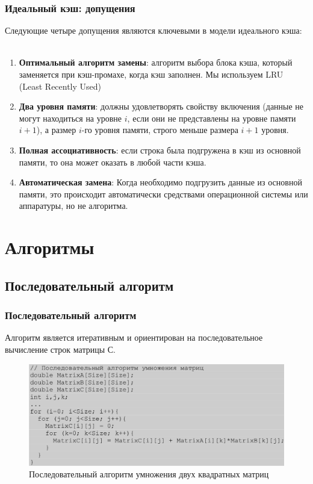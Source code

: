 \documentclass{beamer}
\begin{document}
\begin{frame}
\frametitle{Идеальный кэш: допущения}
Следующие четыре допущения являются ключевыми в модели идеального кэша:\\~\\

\begin{enumerate}
\item \textbf{Оптимальный алгоритм замены}: алгоритм выбора блока кэша, который заменяется при кэш-промахе, когда кэш заполнен. Мы используем LRU (Least Recently Used)
\item \textbf{Два уровня памяти}: должны удовлетворять свойству включения (данные не могут находиться на уровне $i$, если они не представлены на уровне памяти $i + 1$), а размер $i$-го уровня памяти, строго меньше размера $i + 1$ уровня.
\item \textbf{Полная ассоциативность}: если строка была подгружена в кэш из основной памяти, то она может оказать в любой части кэша.
\item \textbf{Автоматическая замена}: Когда необходимо подгрузить данные из основной памяти, это происходит автоматически средствами операционной системы или аппаратуры, но не алгоритма.
\end{enumerate}
\end{frame}

\section{Алгоритмы}

\subsection{Последовательный алгоритм}

\begin{frame}
\frametitle{Последовательный алгоритм}

Алгоритм является итеративным и ориентирован на последовательное вычисление строк матрицы С.

\begin{figure}
\includegraphics[scale=0.30]{res/pic002}
\caption{Последовательный алгоритм умножения двух квадратных матриц}
\end{figure}

\end{frame}
\end{document}
